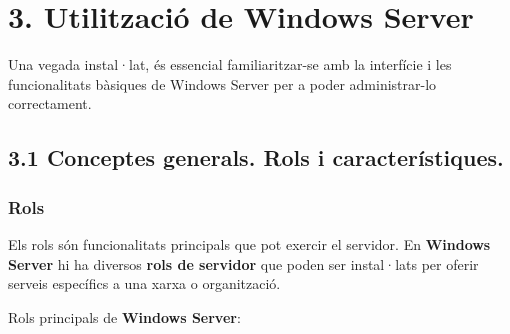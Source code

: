 \documentclass[
  a4paper,
]{article}
\begin{document}
\section{3. Utilització de Windows
Server}\label{utilitzaciuxf3-de-windows-server}

Una vegada instal·lat, és essencial familiaritzar-se amb la interfície i
les funcionalitats bàsiques de Windows Server per a poder administrar-lo
correctament.

\subsection{3.1 Conceptes generals. Rols i
característiques.}\label{conceptes-generals.-rols-i-caracteruxedstiques.}

\subsubsection{Rols}\label{rols}

Els rols són funcionalitats principals que pot exercir el servidor. En
\textbf{Windows Server} hi ha diversos \textbf{rols de servidor} que
poden ser instal·lats per oferir serveis específics a una xarxa o
organització.

Rols principals de \textbf{Windows Server}:
\end{document}
